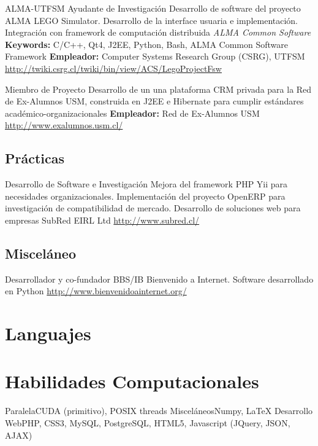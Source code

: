 \documentclass[11pt,a4paper]{moderncv}
\begin{document}
        {ALMA-UTFSM Ayudante de Investigación}
        {Desarrollo de software del proyecto ALMA LEGO Simulator. Desarrollo de la interface usuaria e implementación. Integración con framework de computación distribuida \emph{ALMA Common Software}}
        {\textbf{Keywords:} C/C++, Qt4, J2EE, Python, Bash, ALMA Common Software Framework}
        {\textbf{Empleador:} Computer Systems Research Group (CSRG), UTFSM}
        {\url{http://twiki.csrg.cl/twiki/bin/view/ACS/LegoProjectFsw}}

        {Miembro de Proyecto}
        {Desarrollo de un una plataforma CRM privada para la Red de Ex-Alumnos USM, construida en J2EE e Hibernate para cumplir estándares académico-organizacionales}
        {\textbf{Empleador:} Red de Ex-Alumnos USM}
        {}
        {\url{http://www.exalumnos.usm.cl/}}


\subsection{Prácticas}


        {Desarrollo de Software e Investigación}
        {Mejora del framework PHP Yii para necesidades organizacionales. Implementación del proyecto OpenERP para investigación de compatibilidad de mercado. Desarrollo de soluciones web para empresas}
        {SubRed EIRL Ltd}
        {}
        {\url{http://www.subred.cl/}}


\subsection{Misceláneo}


        {Desarrollador y co-fundador}
        {BBS/IB Bienvenido a Internet. Software desarrollado en Python}
        {}
        {}
        {\url{http://www.bienvenidoainternet.org/}}

\section{Languajes}

\section{Habilidades Computacionales}
           {Paralela}{CUDA (primitivo), POSIX threads}
           {Misceláneos}{Numpy, \LaTeX}
           {Desarrollo Web}{PHP, CSS3, MySQL, PostgreSQL, HTML5, Javascript (JQuery, JSON, AJAX)}
\end{document}
